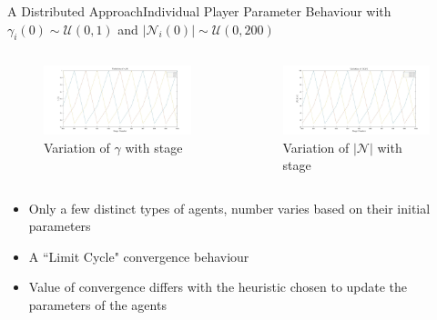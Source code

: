 \documentclass[aspectratio=169]{beamer}
\begin{document}
\begin{frame}{A Distributed Approach}{Individual Player Parameter Behaviour with $\gamma_i(0) \sim \mathcal{U}(0,1)$ and $|\mathcal{N}_i(0)| \sim \mathcal{U}(0,200)$}
\begin{columns}
\begin{figure}
    \centering
\includegraphics[width=\linewidth]{images/results_distributed_player_gamma.jpg}
    \caption{Variation of $\gamma$ with stage}
\end{figure}
\begin{figure}
    \centering
\includegraphics[width=\linewidth]{images/results_distributed_player_neighbours.jpg}
    \caption{Variation of $|\mathcal{N}|$ with stage}
\end{figure}
\end{columns}
\begin{itemize}
    \item <2-> Only a few distinct types of agents, number varies based on their initial parameters
    \item <3-> A ``Limit Cycle" convergence behaviour
    \item <4-> Value of convergence differs with the heuristic chosen to update the parameters of the agents
    
\end{itemize}
\end{frame}
\end{document}
